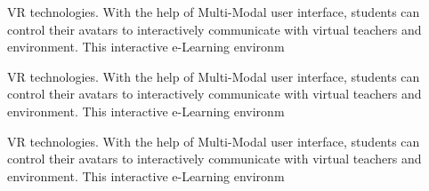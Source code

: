 \documentclass{article}
\begin{document}
VR technologies. With the help of Multi-Modal user interface, students can control their avatars to interactively communicate with virtual teachers and environment. This interactive e-Learning environm \cite{aleci2022psychophysics}

VR technologies. With the help of Multi-Modal user interface, students can control their avatars to interactively communicate with virtual teachers and environment. This interactive e-Learning environm \cite{adoh1992cardiff}

VR technologies. With the help of Multi-Modal user interface, students can control their avatars to interactively communicate with virtual teachers and environment. This interactive e-Learning environm \cite{birch2021recent,adoh1992cardiff}


 







 

\end{document}
